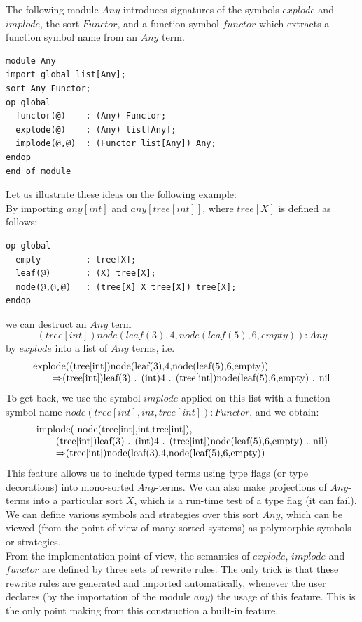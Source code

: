 \documentclass{article}
\begin{document}
{The following module $Any$ introduces signatures of the symbols $explode$ and
$implode$, the sort $Functor$, and a function symbol $functor$ which extracts
a function symbol name from an $Any$ term.
%
{\small
\begin{verbatim}
module Any
import global list[Any];
sort Any Functor;
op global
  functor(@)    : (Any) Functor;
  explode(@)    : (Any) list[Any];
  implode(@,@)  : (Functor list[Any]) Any;
endop
end of module
\end{verbatim}}\noindent
%
Let us illustrate these ideas on the following example: \\
%
By importing $any[int]$ and $any[tree[int]]$, where $tree[X]$ is defined 
as follows:
%
{\small
\begin{verbatim}
op global 
  empty         : tree[X];
  leaf(@)       : (X) tree[X];
  node(@,@,@)   : (tree[X] X tree[X]) tree[X];
endop
\end{verbatim}}\noindent
%
we can destruct an $Any$ term 
\[
(tree[int])node(leaf(3),4,node(leaf(5),6,empty))  : Any
\]
by $explode$ into a list of $Any$ terms, i.e.
\[\begin{tabular}{l}
        explode((tree[int])node(leaf(3),4,node(leaf(5),6,empty)) \\
        \qquad \rewrite
        (tree[int])leaf(3)  . 
        (int)4  . 
        (tree[int])node(leaf(5),6,empty)  . 
        nil
\end{tabular}\]
To get back, we use the symbol $implode$ applied on this list with a function
symbol name $node(tree[int],int,tree[int])  :  Functor$, and we obtain:
\[\begin{tabular}{l}
        implode(
        node(tree[int],int,tree[int]), \\
        \qquad (tree[int])leaf(3)  .
        (int)4  .
        (tree[int])node(leaf(5),6,empty)  .  nil) \\
        \qquad \rewrite 
        (tree[int])node(leaf(3),4,node(leaf(5),6,empty))
\end{tabular}\]
%
This feature allows us to include typed terms using type flags 
(or type decorations) into mono-sorted $Any$-terms. We can also
make projections of $Any$-terms into a particular sort $X$, which
is a run-time test of a type flag (it can fail).
We can define various symbols and strategies over this sort $Any$,
which can be viewed (from the point of view of many-sorted systems)
as polymorphic symbols or strategies. \\
%
From the implementation point of view, the semantics of 
$explode$, $implode$ and $functor$ are defined by three sets
of rewrite rules. 
The only trick is that these rewrite rules 
are generated and imported automatically,
whenever the user declares 
(by the importation of the module $any$)
the usage of this feature.
This is the only point making from this construction a built-in 
feature.

}
\end{document}
